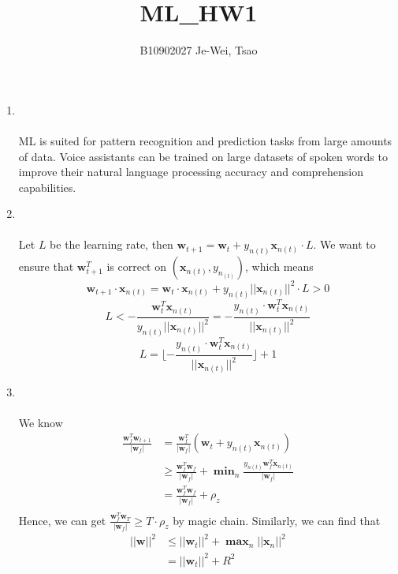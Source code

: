 \documentclass{article}
\title{ML\_HW1}
\author{B10902027 Je-Wei, Tsao}
\begin{document}
\maketitle
\begin{enumerate}
    \item \text{[a]}\\%
    \\ML is suited for pattern recognition and prediction tasks from large amounts of data. Voice assistants can be trained on large datasets of spoken words to improve their natural language processing accuracy and comprehension capabilities.\\
    \item \text{[d]}\\%
    \\Let $L$ be the learning rate, then $\textbf{w}_{t+1} = \textbf{w}_t + y_{n(t)}\textbf{x}_{n(t)}\cdot L$. We want to ensure that $\textbf{w}^T_{t+1}$ is correct on $(\textbf{x}_{n(t)}, y_{n_(t)})$, which means 
    \[\textbf{w}_{t+1}\cdot \textbf{x}_{n(t)} = \textbf{w}_t\cdot \textbf{x}_{n(t)} + y_{n(t)}||\textbf{x}_{n(t)}||^2\cdot L > 0\]
    \[L < -\frac{\textbf{w}_t^T \textbf{x}_{n(t)}}{y_{n(t)}||\textbf{x}_{n(t)}||^2} = -\frac{y_{n(t)}\cdot \textbf{w}_t^T \textbf{x}_{n(t)}}{||\textbf{x}_{n(t)}||^2}\]
    \[L = \lfloor -\frac{y_{n(t)}\cdot \textbf{w}_t^T \textbf{x}_{n(t)}}{||\textbf{x}_{n(t)}||^2} \rfloor + 1\]
    \item \text{[c]}\\%
    \\We know
    \begin{align*}
        \frac{\textbf{w}^T_f\textbf{w}_{t+1}}{|\textbf{w}_f|} & = \frac{\textbf{w}^T_f}{|\textbf{w}_f|}(\textbf{w}_t + y_{n(t)}\textbf{x}_{n(t)})\\
        & \geq \frac{\textbf{w}^T_f\textbf{w}_f}{|\textbf{w}_f|} + \mathop{\boldsymbol{min}}_n\frac{y_{n(t)}\textbf{w}^T_f\textbf{x}_{n(t)}}{|\textbf{w}_f|}\\
        & = \frac{\textbf{w}^T_f\textbf{w}_f}{|\textbf{w}_f|} + \rho_z\\
    \end{align*}
    Hence, we can get $\frac{\textbf{w}^T_f\textbf{w}_T}{|\textbf{w}_f|} \geq T\cdot\rho_z$ by magic chain. Similarly, we can find that
    \begin{align*}
        ||\textbf{w}||^2 & \leq ||\textbf{w}_t||^2 + \mathop{\boldsymbol{max}}_n||\textbf{x}_n||^2\\
        & = ||\textbf{w}_t||^2 + R^2\\

\end{align*}
\end{enumerate}
\end{document}
